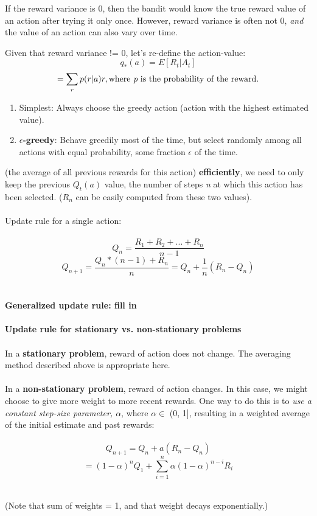 \documentclass{article} %
\begin{document}
\noindent If the reward variance is 0, then the bandit would know the true reward value of an action after trying it only once. However, reward variance is often not 0, {\it and} the value of an action can also vary over time.

Given that reward variance != 0, let's re-define the action-value:
\[q_{*}(a) = E[R_{t} | A_{t}]\]
\[ = \sum_{r}p(r|a)r, \textrm {where {\it p} is the probability of the reward.} \]

\pagebreak 


\begin{enumerate}
	\item Simplest: Always choose the greedy action (action with the highest estimated value).
	\item {\bf $\epsilon$-greedy}:  Behave greedily most of the time, but select randomly among all actions with equal probability, some fraction $\epsilon$ of the time.
\end{enumerate}


 (the average of all previous rewards for this action) {\bf efficiently}, we need to only keep the previous $Q_{t}(a)$ value, the number of steps {\it n} at which this action has been selected. (${R_n}$ can be easily computed from these two values). 
\\\\
Update rule for a single action:
 \\\\
\[Q_{n} = \frac{R_1 + R_2 + ... + R_n}{n - 1}\]
\[Q_{n+1} =  \frac{Q_n * (n-1) + R_n}{n} = Q_n + \frac{1}{n}(R_n - Q_n) \] 
\\\\
{\bf Generalized update rule: fill in }
\\\\
{\bf Update rule for stationary vs. non-stationary problems}\\\\
In a {\bf stationary problem}, reward of action does not change. The averaging method described above is appropriate here. \\\\
In a {\bf non-stationary problem}, reward of action changes. In this case, we might choose to give more weight to more recent rewards. One way to do this is to {\it use a constant step-size parameter, $\alpha$}, where $\alpha \in$ (0, 1], resulting in a weighted average of the initial estimate and past rewards:\\\\
\[Q_{n+1} = Q_n + a(R_n - Q_n)\]
\[= (1-\alpha)^nQ_1 + \sum_{i=1}^n\alpha(1-\alpha)^{n-i}R_i\]\\
\begin{center}(Note that sum of weights = 1, and that weight decays exponentially.)\end{center}
\end{document}

